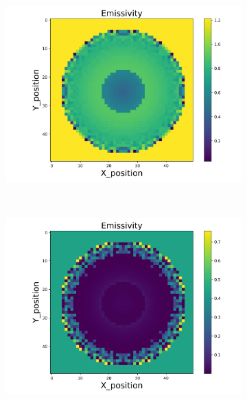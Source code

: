 \begin{figure}[p]
\begin{minipage}{\textwidth}
\begin{subfigure}{0.325\textwidth}
            \includegraphics[width=\textwidth]{figures/raw_data/31/quad/emi_cal.jpg}
        \end{subfigure}
    \end{minipage}\\
    \begin{minipage}{\textwidth}
        \centering
        \begin{subfigure}{0.325\textwidth}
            \centering
            \includegraphics[width=\textwidth]{figures/raw_data/32/quad/emi_cal.jpg}
        \end{subfigure}
        \begin{subfigure}{0.325\textwidth}

\end{subfigure}
\end{minipage}
\end{figure}
